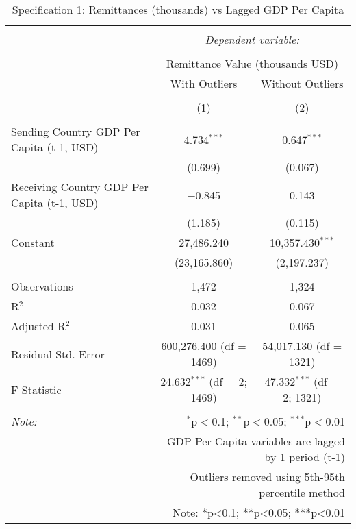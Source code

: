 
\begin{table}[!htbp] \centering 
  \caption{Specification 1: Remittances (thousands) vs Lagged GDP Per Capita} 
  \label{} 
\begin{tabular}{@{\extracolsep{5pt}}lcc} 
\\[-1.8ex]\hline 
\hline \\[-1.8ex] 
 & \multicolumn{2}{c}{\textit{Dependent variable:}} \\ 
\cline{2-3} 
\\[-1.8ex] & \multicolumn{2}{c}{Remittance Value (thousands USD)} \\ 
 & With Outliers & Without Outliers \\ 
\\[-1.8ex] & (1) & (2)\\ 
\hline \\[-1.8ex] 
 Sending Country GDP Per Capita (t-1, USD) & 4.734$^{***}$ & 0.647$^{***}$ \\ 
  & (0.699) & (0.067) \\ 
  Receiving Country GDP Per Capita (t-1, USD) & $-$0.845 & 0.143 \\ 
  & (1.185) & (0.115) \\ 
  Constant & 27,486.240 & 10,357.430$^{***}$ \\ 
  & (23,165.860) & (2,197.237) \\ 
 \hline \\[-1.8ex] 
Observations & 1,472 & 1,324 \\ 
R$^{2}$ & 0.032 & 0.067 \\ 
Adjusted R$^{2}$ & 0.031 & 0.065 \\ 
Residual Std. Error & 600,276.400 (df = 1469) & 54,017.130 (df = 1321) \\ 
F Statistic & 24.632$^{***}$ (df = 2; 1469) & 47.332$^{***}$ (df = 2; 1321) \\ 
\hline 
\hline \\[-1.8ex] 
\textit{Note:}  & \multicolumn{2}{r}{$^{*}$p$<$0.1; $^{**}$p$<$0.05; $^{***}$p$<$0.01} \\ 
 & \multicolumn{2}{r}{GDP Per Capita variables are lagged by 1 period (t-1)} \\ 
 & \multicolumn{2}{r}{Outliers removed using 5th-95th percentile method} \\ 
 & \multicolumn{2}{r}{Note: *p<0.1; **p<0.05; ***p<0.01} \\ 
\end{tabular} 
\end{table} 
